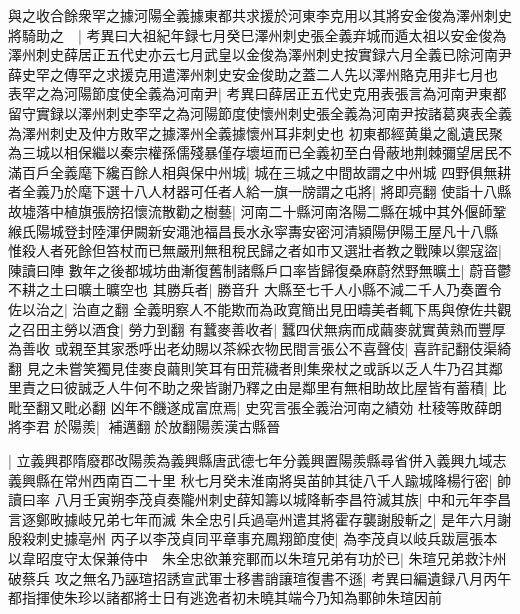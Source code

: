 與之收合餘衆罕之據河陽全義據東都共求援於河東李克用以其將安金俊為澤州刺史將騎助之　|{
	考異曰大祖紀年録七月癸巳澤州刺史張全義弃城而遁太祖以安金俊為澤州刺史薛居正五代史亦云七月武皇以金俊為澤州刺史按實録六月全義已除河南尹薛史罕之傳罕之求援克用遣澤州刺史安金俊助之蓋二人先以澤州賂克用非七月也}
表罕之為河陽節度使全義為河南尹|{
	考異曰薛居正五代史克用表張言為河南尹東都留守實録以澤州刺史李罕之為河陽節度使懷州刺史張全義為河南尹按諸葛爽表全義為澤州刺史及仲方敗罕之據澤州全義據懷州耳非刺史也}
初東都經黄巢之亂遺民聚為三城以相保繼以秦宗權孫儒殘暴僅存壞垣而已全義初至白骨蔽地荆棘彌望居民不滿百戶全義麾下纔百餘人相與保中州城|{
	城在三城之中間故謂之中州城}
四野俱無耕者全義乃於麾下選十八人材器可任者人給一旗一牓謂之屯將|{
	將即亮翻}
使詣十八縣故墟落中植旗張牓招懷流散勸之樹藝|{
	河南二十縣河南洛陽二縣在城中其外偃師鞏緱氏陽城登封陸渾伊闕新安澠池福昌長水永寜夀安密河清潁陽伊陽王屋凡十八縣}
惟殺人者死餘但笞杖而已無嚴刑無租稅民歸之者如市又選壯者教之戰陳以禦寇盜|{
	陳讀曰陣}
數年之後都城坊曲漸復舊制諸縣戶口率皆歸復桑麻蔚然野無曠土|{
	蔚音鬱不耕之土曰曠土曠空也}
其勝兵者|{
	勝音升}
大縣至七千人小縣不減二千人乃奏置令佐以治之|{
	治直之翻}
全義明察人不能欺而為政寛簡出見田疇美者輒下馬與僚佐共觀之召田主勞以酒食|{
	勞力到翻}
有蠶麥善收者|{
	蠶四伏無病而成繭麥就實黄熟而豐厚為善收}
或親至其家悉呼出老幼賜以茶綵衣物民間言張公不喜聲伎|{
	喜許記翻伎渠綺翻}
見之未嘗笑獨見佳麥良繭則笑耳有田荒穢者則集衆杖之或訴以乏人牛乃召其鄰里責之曰彼誠乏人牛何不助之衆皆謝乃釋之由是鄰里有無相助故比屋皆有蓄積|{
	比毗至翻又毗必翻}
凶年不饑遂成富庶焉|{
	史究言張全義治河南之績効}
杜稜等敗薛朗將李君於陽羨|{
	補邁翻於放翻陽羨漢古縣晉}


|{
	立義興郡隋廢郡改陽羨為義興縣唐武德七年分義興置陽羨縣尋省併入義興九域志義興縣在常州西南百二十里}
秋七月癸未淮南將吳苖帥其徒八千人踰城降楊行密|{
	帥讀曰率}
八月壬寅朔李茂貞奏隴州刺史薛知籌以城降斬李昌符滅其族|{
	中和元年李昌言逐鄭畋據岐兄弟七年而滅}
朱全忠引兵過亳州遣其將霍存襲謝殷斬之|{
	是年六月謝殷殺刺史據亳州}
丙子以李茂貞同平章事充鳳翔節度使|{
	為李茂貞以岐兵跋扈張本}
以韋昭度守太保兼侍中　朱全忠欲兼兖鄆而以朱瑄兄弟有功於已|{
	朱瑄兄弟救汴州破蔡兵}
攻之無名乃誣瑄招誘宣武軍士移書誚讓瑄復書不遜|{
	考異曰編遺録八月丙午都指揮使朱珍以諸都將士日有逃逸者初未曉其端今乃知為鄆帥朱瑄因前}


